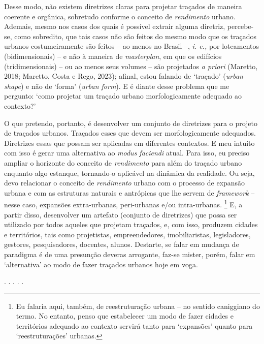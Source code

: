 \documentclass[12pt, a4paper]{book} %
\begin{document}
        Desse modo, não existem diretrizes claras para projetar traçados de maneira coerente e orgânica, sobretudo conforme o conceito de \textit{rendimento} urbano. Ademais, mesmo nos casos dos quais é possível extrair alguma diretriz, percebe-se, como sobredito, que tais casos não são feitos do mesmo modo que os traçados urbanos costumeiramente são feitos – ao menos no Brasil –, \textit{i. e.,} por loteamentos (bidimensionais) – e não à maneira de \textit{masterplan}, em que os edifícios (tridimensionais) – ou ao menos seus volumes – são projetados \textit{a priori} (Maretto, 2018; Maretto, Costa e Rego, 2023); afinal, estou falando de `traçado' (\textit{urban shape}) e não de `forma' (\textit{urban form}). E é diante desse problema que me pergunto: `como projetar um traçado urbano morfologicamente adequado ao contexto?' 

        O que pretendo, portanto, é desenvolver um conjunto de diretrizes para o projeto de traçados urbanos. Traçados esses que devem ser morfologicamente adequados. Diretrizes essas que possam ser aplicadas em diferentes contextos. E meu intuito com isso é gerar uma alternativa ao \textit{modus faciendi} atual. Para isso, eu preciso ampliar o horizonte do conceito de \textit{rendimento} para além do traçado urbano enquanto algo estanque, tornando-o aplicável na dinâmica da realidade. Ou seja, devo relacionar o conceito de \textit{rendimento} urbano com o processo de expansão urbana e com as estruturas naturais e antrópicas que lhe servem de \textit{framework} – nesse caso, expansões extra-urbanas, peri-urbanas e/ou intra-urbanas.
            \footnote[6]{Eu falaria aqui, também, de reestruturação urbana – no sentido caniggiano do termo. No entanto, penso que estabelecer um modo de fazer cidades e territórios adequado ao contexto servirá tanto para `expansões' quanto para `reestruturações' urbanas.} 
        E, a partir disso, desenvolver um artefato (conjunto de diretrizes) que possa ser utilizado por todos aqueles que projetam traçados, e, com isso, produzem cidades e territórios, tais como projetistas, empreendedores, imobiliaristas, legisladores, gestores, pesquisadores, docentes, alunos. Destarte, se falar em mudança de paradigma é de uma presunção deveras arrogante, faz-se mister, porém, falar em `alternativa' ao modo de fazer traçados urbanos hoje em voga.

        \begin{center}
        . . . . .
        \end{center}
\end{document}
